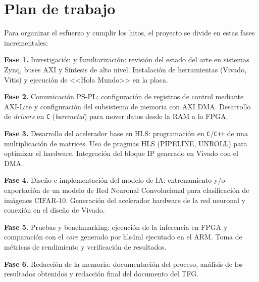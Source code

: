 \section{Plan de trabajo}
Para organizar el esfuerzo y cumplir los hitos, el proyecto se divide en estas fases incrementales:

\textbf{Fase 1.} Investigación y familiarización: revisión del estado del arte en sistemas Zynq,
buses \ac{AXI} y Síntesis de alto nivel. Instalación de herramientas (Vivado, Vitis) y
ejecución de <<Hola Mundo>> en la placa.

\textbf{Fase 2.} Comunicación \ac{PS}-\ac{PL}: configuración de registros de control
mediante \ac{AXI}-Lite y
configuración del subsistema de memoria con \ac{AXI} \ac{DMA}. Desarrollo de
\textit{drivers} en \texttt{C}
(\textit{baremetal}) para mover datos desde la \ac{RAM} a la \ac{FPGA}.

\textbf{Fase 3.} Desarrollo del acelerador base en \ac{HLS}: programación en
\texttt{C}/\texttt{C++} de una
multiplicación de matrices. Uso de pragmas \ac{HLS} (PIPELINE, UNROLL) para optimizar el
hardware. Integración del bloque \ac{IP} generado en Vivado con el \ac{DMA}.

\textbf{Fase 4.} Diseño e implementación del modelo de \ac{IA}: entrenamiento y/o exportación de un
modelo de Red Neuronal Convolucional para clasificación de imágenes \ac{CIFAR}-10. Generación
del acelerador hardware de la red neuronal y conexión en el diseño de Vivado.

\textbf{Fase 5.} Pruebas y benchmarking: ejecución de la inferencia en \ac{FPGA} y comparación con
el \textit{core} generado por hls4ml ejecutado en el \ac{ARM}. Toma de métricas de
rendimiento y verificación de
resultados.

\textbf{Fase 6.} Redacción de la memoria: documentación del proceso, análisis de los resultados
obtenidos y redacción final del documento del TFG.
